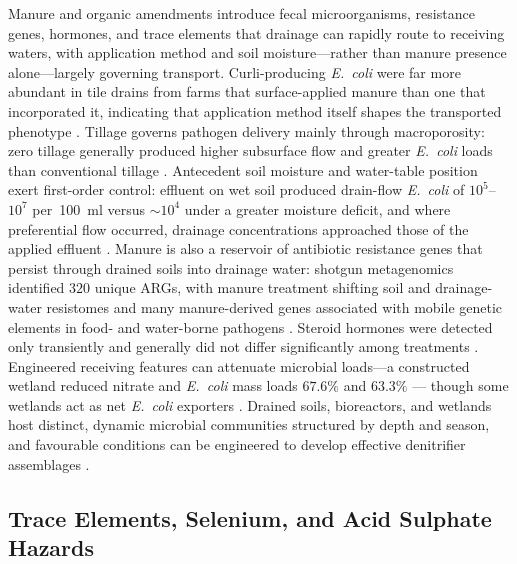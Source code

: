 \documentclass[11pt]{article}
\begin{document}
Manure and organic amendments introduce fecal microorganisms, resistance genes,
hormones, and trace elements that drainage can rapidly route to receiving waters,
with application method and soil moisture---rather than manure presence
alone---largely governing transport. Curli-producing \textit{E.\ coli} were far
more abundant in tile drains from farms that surface-applied manure than one that
incorporated it, indicating that application method itself shapes the transported
phenotype \parencite{Truhlar2015}. Tillage governs pathogen delivery mainly
through macroporosity: zero tillage generally produced higher subsurface flow and
greater \textit{E.\ coli} loads than conventional tillage
\parencite{Thiagarajan2007,Jenkins2009}. Antecedent soil moisture and water-table
position exert first-order control: effluent on wet soil produced drain-flow
\textit{E.\ coli} of $10^{5}$--$10^{7}$ per~100~ml versus $\sim10^{4}$ under a
greater moisture deficit, and where preferential flow occurred, drainage
concentrations approached those of the applied effluent
\parencite{Collins2007,Ding2021}. Manure is also a reservoir of antibiotic
resistance genes that persist through drained soils into drainage water: shotgun
metagenomics identified $320$ unique ARGs, with manure treatment shifting soil
and drainage-water resistomes and many manure-derived genes associated with
mobile genetic elements in food- and water-borne pathogens \parencite{Smith2019b}.
Steroid hormones were detected only transiently and generally did not differ
significantly among treatments \parencite{Jenkins2009}. Engineered receiving
features can attenuate microbial loads---a constructed wetland reduced nitrate and
\textit{E.\ coli} mass loads $67.6\%$ and $63.3\%$ \parencite{Haverstock2017}---
though some wetlands act as net \textit{E.\ coli} exporters \parencite{Stott2023}.
Drained soils, bioreactors, and wetlands host distinct, dynamic microbial
communities structured by depth and season, and favourable conditions can be
engineered to develop effective denitrifier assemblages
\parencite{Andrus2014,Porter2015,Hathaway2015,Knorr2023,Schilling2017}.

\subsection{Trace Elements, Selenium, and Acid Sulphate Hazards}
\end{document}
